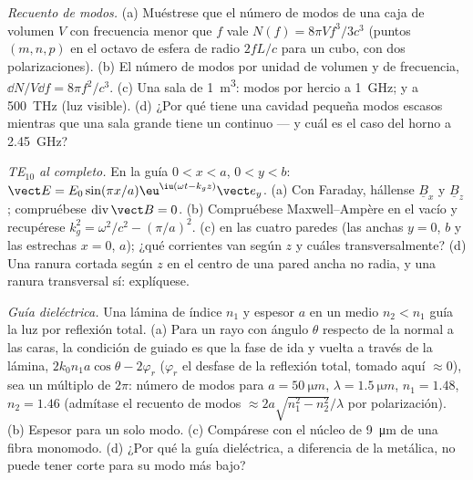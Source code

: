 \begin{exercise}[$\star\star$]\label{exo:b2:guided-waves:9}
\emph{Recuento de modos.} (a) Muéstrese que el número de modos de una caja de
volumen $V$ con frecuencia menor que $f$ vale $N(f) = 8\pi Vf^3/3c^3$ (puntos
$(m, n, p)$ en el octavo de esfera de radio $2fL/c$ para un cubo, con dos
polarizaciones). (b) El número de modos por unidad de volumen y de frecuencia,
$\dd N/V\dd f = 8\pi f^2/c^3$. (c) Una sala de \qty{1}{m^3}: modos por hercio a
\qty{1}{GHz}; y a \qty{500}{THz} (luz visible). (d) ¿Por qué tiene una cavidad
pequeña modos escasos mientras que una sala grande tiene un continuo --- y cuál
es el caso del horno a \qty{2.45}{GHz}?
\end{exercise}

\begin{exercise}[$\star\star\star$]\label{exo:b2:guided-waves:10}
\emph{TE$_{10}$ al completo.} En la guía $0 < x < a$, $0 < y < b$: $\vect E =
E_0\sin(\pi x/a)\eu^{\iu(\omega t - k_gz)}\vect e_y$. (a) Con Faraday, hállense $\underline B_x$
y $\underline B_z$; compruébese $\operatorname{div}\vect B = 0$. (b) Compruébese Maxwell--Ampère
en el vacío y recupérese $k_g^2 = \omega^2/c^2 - (\pi/a)^2$. (c) 
en las cuatro paredes (las anchas $y = 0$, $b$ y las estrechas $x = 0$,
$a$); ¿qué corrientes van según $z$ y cuáles transversalmente? (d) Una ranura cortada según
$z$ en el centro de una pared ancha no radia, y una ranura transversal sí:
explíquese.
\end{exercise}

\begin{exercise}[$\star\star\star$]\label{exo:b2:guided-waves:11}
\emph{Guía dieléctrica.} Una lámina de índice $n_1$ y espesor $a$ en un
medio $n_2 < n_1$ guía la luz por reflexión total. (a) Para un rayo con
ángulo $\theta$ respecto de la normal a las caras, la condición de guiado es que
la fase de ida y vuelta a través de la lámina, $2k_0n_1a\cos\theta - 2\varphi_r$ ($\varphi_r$
el desfase de la reflexión total, tomado aquí $\approx 0$), sea un múltiplo
de $2\pi$: número de modos para $a = \qty{50}{\micro m}$, $\lambda = \qty{1.5}{\micro m}$,
$n_1 = 1.48$, $n_2 = 1.46$ (admítase el recuento de modos $\approx 2a\sqrt{n_1^2 - n_2^2}/\lambda$
por polarización). (b) Espesor para un solo modo. (c) Compárese con el núcleo
de \qty{9}{\micro m} de una fibra monomodo. (d) ¿Por qué la guía dieléctrica,
a diferencia de la metálica, no puede tener corte para su modo más bajo?
\end{exercise}

